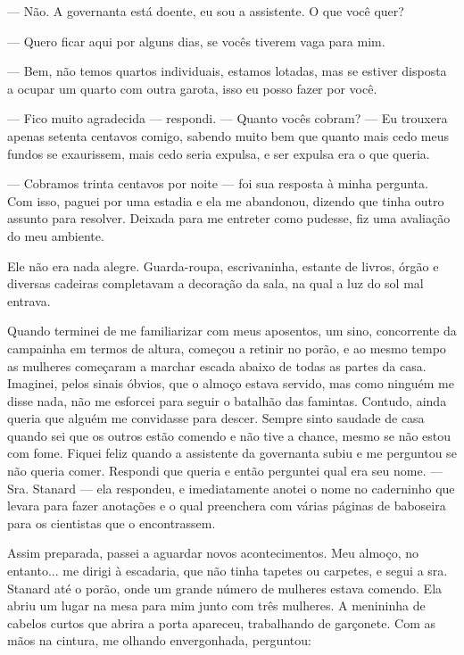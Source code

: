 --- Não. A governanta está doente, eu sou a assistente. O que você quer?

--- Quero ficar aqui por alguns dias, se vocês tiverem vaga para mim.

--- Bem, não temos quartos individuais, estamos lotadas, mas se estiver
disposta a ocupar um quarto com outra garota, isso eu posso fazer por
você.

--- Fico muito agradecida --- respondi. --- Quanto vocês cobram? --- Eu
trouxera apenas setenta centavos comigo, sabendo muito bem que quanto
mais cedo meus fundos se exaurissem, mais cedo seria expulsa, e ser
expulsa era o que queria.

--- Cobramos trinta centavos por noite --- foi sua resposta à minha
pergunta. Com isso, paguei por uma estadia e ela me abandonou, dizendo
que tinha outro assunto para resolver. Deixada para me entreter como
pudesse, fiz uma avaliação do meu ambiente.

Ele não era nada alegre. Guarda-roupa, escrivaninha, estante de livros,
órgão e diversas cadeiras completavam a decoração da sala, na qual a luz
do sol mal entrava.

Quando terminei de me familiarizar com meus aposentos, um sino,
concorrente da campainha em termos de altura, começou a retinir no
porão, e ao mesmo tempo as mulheres começaram a marchar escada abaixo de
todas as partes da casa. Imaginei, pelos sinais óbvios, que o almoço
estava servido, mas como ninguém me disse nada, não me esforcei para
seguir o batalhão das famintas. Contudo, ainda queria que alguém me
convidasse para descer. Sempre sinto saudade de casa quando sei que os
outros estão comendo e não tive a chance, mesmo se não estou com fome.
Fiquei feliz quando a assistente da governanta subiu e me perguntou se
não queria comer. Respondi que queria e então perguntei qual era seu
nome. --- Sra. Stanard --- ela respondeu, e imediatamente anotei o nome no
caderninho que levara para fazer anotações e o qual preenchera com
várias páginas de baboseira para os cientistas que o encontrassem.

Assim preparada, passei a aguardar novos acontecimentos. Meu almoço, no
entanto... me dirigi à escadaria, que não tinha tapetes ou carpetes, e
segui a sra. Stanard até o porão, onde um grande número de mulheres
estava comendo. Ela abriu um lugar na mesa para mim junto com três
mulheres. A menininha de cabelos curtos que abrira a porta apareceu,
trabalhando de garçonete. Com as mãos na cintura, me olhando
envergonhada, perguntou:

